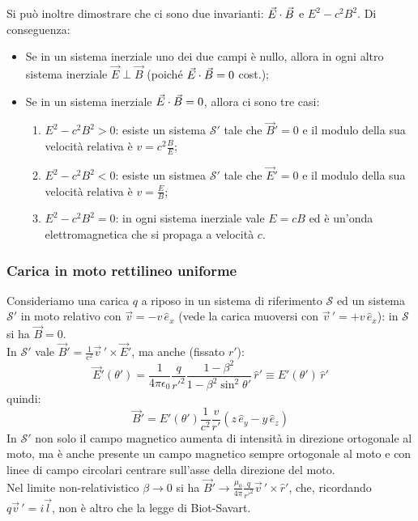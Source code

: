 \documentclass[]{article}
\begin{document}
Si può inoltre dimostrare che ci sono due invarianti: $ \vec{E}\cdot\vec{B} $ e $ E^2 - c^2B^2 $. Di conseguenza:
\begin{itemize}
	\item Se in un sistema inerziale uno dei due campi è nullo, allora in ogni altro sistema inerziale $ \vec{E}\perp\vec{B} $ (poiché $ \vec{E}\cdot\vec{B} = 0 $ cost.);
	\item Se in un sistema inerziale $ \vec{E}\cdot\vec{B} = 0 $, allora ci sono tre casi:
	\begin{enumerate}
		\item $ E^2 - c^2B^2 > 0 $: esiste un sistema $ \mathcal{S}' $ tale che $ \vec{B}' = 0 $ e il modulo della sua velocità relativa è $ v = c^2 \frac{B}{E} $;
		\item $ E^2 - c^2B^2 < 0 $: esiste un sistmea $ \mathcal{S}' $ tale che $ \vec{E}' = 0 $ e il modulo della sua velocità relativa è $ v = \frac{E}{B} $;
		\item $ E^2 - c^2B^2 = 0 $: in ogni sistema inerziale vale $ E = c B $ ed è un'onda elettromagnetica che si propaga a velocità $ c $.
	\end{enumerate}
\end{itemize}

\subsubsection{Carica in moto rettilineo uniforme}

Consideriamo una carica $ q $ a riposo in un sistema di riferimento $ \mathcal{S} $ ed un sistema $ \mathcal{S}' $ in moto relativo con $ \vec{v} = -v\,\hat{e}_x $ (vede la carica muoversi con $ \vec{v}\,' = +v\,\hat{e}_x $): in $ \mathcal{S} $ si ha $ \vec{B} = 0 $. \\ 
In $ \mathcal{S}' $ vale $ \vec{B}' = \frac{1}{c^2} \vec{v}\,'\times\vec{E}' $, ma anche (fissato $ r' $):
\begin{equation}
	\vec{E}'(\theta') = \frac{1}{4\pi\epsilon_0} \frac{q}{r'^2} \frac{1 - \beta^2}{1 - \beta^2\sin^2\theta'} \,\hat{r}' \equiv E'(\theta') \,\hat{r}'
	\label{eq:47}
\end{equation}
quindi:
\begin{equation}
	\vec{B}' = E'(\theta')\frac{1}{c^2}\frac{v}{r'} (z\,\hat{e}_y - y\,\hat{e}_z)
	\label{eq:48}
\end{equation}
In $ \mathcal{S}' $ non solo il campo magnetico aumenta di intensità in direzione ortogonale al moto, ma è anche presente un campo magnetico sempre ortogonale al moto e con linee di campo circolari centrare sull'asse della direzione del moto. \\ 
Nel limite non-relativistico $ \beta \rightarrow 0 $ si ha $ \vec{B}' \rightarrow \frac{\mu_0}{4\pi}\frac{q}{r'^2}\vec{v}\,'\times\hat{r}' $, che, ricordando $ q\vec{v}\,' = i \vec{l} $, non è altro che la legge di Biot-Savart.
\end{document}
